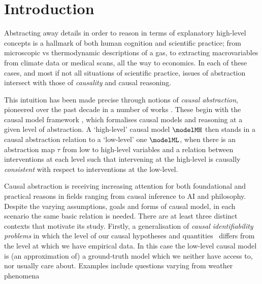 \documentclass{article}
\begin{document}
\section{Introduction} \label{sec:intro}

Abstracting away details in order to reason in terms of explanatory high-level concepts is a hallmark of both human cognition and scientific practice; from microscopic vs thermodynamic descriptions of a gas, to extracting macrovariables from climate data or medical scans, all the way to economics. In each of these cases, and most if not all situations of scientific practice, issues of abstraction intersect with those of \emph{causality} and causal reasoning. 

This intuition has been made precise through notions of \emph{causal abstraction}, pioneered over the past decade in a number of works \cite{ChalupkaEtAl_2017_CausalFeatureLearning, rubenstein2017causal, BeckersEtAl_2019_AbstractingCausalModles, beckers2020approximate, massidda2023causal, geiger2023causal}. These begin with the causal model framework \cite{pearl2009causality}, which formalises causal models and reasoning at a given level of abstraction. A `high-level' causal model $\modelMH$ then stands in a causal abstraction relation to a `low-level' one $\modelML$, when there is an abstraction map $\tau$ from low to high-level variables and a relation between interventions at each level such that intervening at the high-level is causally \emph{consistent} with respect to interventions at the low-level. 

Causal abstraction is receiving increasing attention for both foundational and practical reasons in fields ranging from causal inference to AI and philosophy. Despite the varying assumptions, goals and forms of causal model, in each scenario the same basic relation is needed. There are at least three distinct contexts that motivate its study. Firstly, a generalisation of \emph{causal identifiability problems} in which the level of our causal hypotheses and quantities \ differs from the level at which we have empirical data. In this case the low-level causal model is (an approximation of) a ground-truth model which we neither have access to, nor usually care about. 
Examples include questions varying from weather phenomena 
\end{document}
